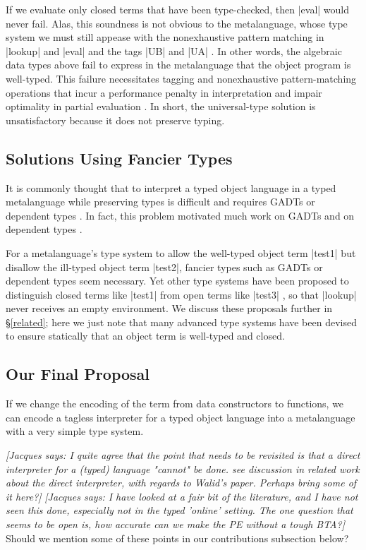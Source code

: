 \documentclass[preprint]{sigplanconf}
\newcommand{\jacques}[1]{{\it [Jacques says: #1]}}
\begin{document}
If we evaluate only closed terms that have been type-checked, then
|eval| would never fail. Alas, this soundness is not obvious to the
metalanguage, whose type system we must still appease with the
nonexhaustive pattern matching in |lookup| and |eval| and the tags |UB|
and |UA| \citep[\S1.4]{WalidICFP02}.  In other words, the algebraic data
types above fail to express in the metalanguage that the object program
is well-typed.  This failure necessitates tagging and nonexhaustive
pattern\hyp matching operations that incur a performance penalty in
interpretation and impair optimality in partial evaluation
\citep{taha-tag}.  In short, the universal\hyp type solution is
unsatisfactory because it does not preserve typing.

\subsection{Solutions Using Fancier Types}

It is commonly thought that to interpret a typed object language in
a typed metalanguage while preserving types is difficult and requires
GADTs or dependent types \citep{taha-tag}.  In fact, this problem
motivated much work on GADTs \citep{xi-guarded,peyton-jones-simple} and
on dependent types \citep{WalidICFP02,fogarty-concoqtion}.

For a metalanguage's type system to allow the well-typed object term
|test1| but disallow the ill-typed object term |test2|, fancier types
such as GADTs or dependent types seem necessary.  Yet other type systems
have been proposed to distinguish closed terms like |test1| from open
terms like |test3|
\citep{WalidPOPL03,NanevskiICFP02,NanevskiJFP05,DaviesJACM01,nanevski-contextual},
so that |lookup| never receives an empty environment.  We discuss these
proposals further in \S\ref{related}; here we just note that many
advanced type systems have been devised to ensure statically that an
object term is well-typed and closed.

\subsection{Our Final Proposal}\label{ourapproach}

If we change the encoding of the term from data
constructors to functions, we can encode a tagless interpreter for a
typed object language into a metalanguage with a very simple type system.




\jacques{I quite agree that the point that needs to be revisited is
  that a \emph{direct} interpreter for a (typed) language "cannot" be
  done. see discussion in related work about the direct interpreter,
  with regards to Walid's paper. Perhaps bring some of it here?}
\jacques{I have looked at a fair bit of the literature, and I have not
  seen this done, especially not in the typed 'online' setting.  The
  one question that seems to be open is, how accurate can we make the
  PE without a tough BTA?}
Should we mention some of these points in our contributions subsection
below?
\end{document}
